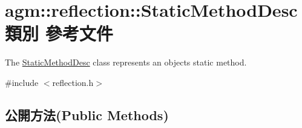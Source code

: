 \hypertarget{classagm_1_1reflection_1_1_static_method_desc}{}\section{agm\+:\+:reflection\+:\+:Static\+Method\+Desc 類別 參考文件}
\label{classagm_1_1reflection_1_1_static_method_desc}


The \hyperlink{classagm_1_1reflection_1_1_static_method_desc}{Static\+Method\+Desc} class represents an object\textquotesingle{}s static method.  




{\ttfamily \#include $<$reflection.\+h$>$}

\subsection*{公開方法(Public Methods)}

